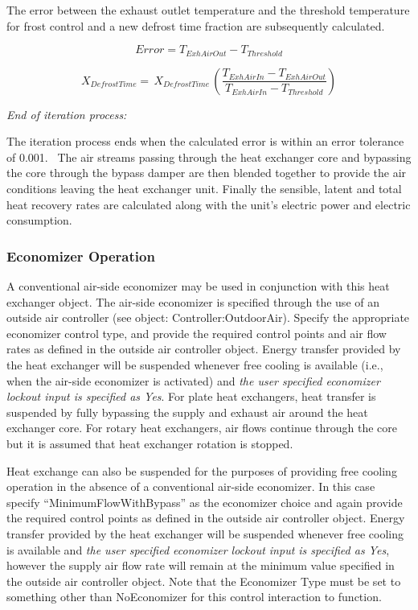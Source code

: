 The error between the exhaust outlet temperature and the threshold temperature for frost control and a new defrost time fraction are subsequently calculated.

\begin{equation}
Error = {T_{ExhAirOut}} - {T_{Threshold}}
\end{equation}

\begin{equation}
{X_{DefrostTime}} = \,{X_{DefrostTime}}\,\left( {\frac{{{T_{ExhAirIn}} - {T_{ExhAirOut}}}}{{{T_{ExhAirIn}} - {T_{Threshold}}}}} \right)
\end{equation}

\emph{End of iteration process:}

The iteration process ends when the calculated error is within an error tolerance of 0.001.~ The air streams passing through the heat exchanger core and bypassing the core through the bypass damper are then blended together to provide the air conditions leaving the heat exchanger unit. Finally the sensible, latent and total heat recovery rates are calculated along with the unit's electric power and electric consumption.

\subsubsection{Economizer Operation}\label{economizer-operation}

A conventional air-side economizer may be used in conjunction with this heat exchanger object. The air-side economizer is specified through the use of an outside air controller (see object: Controller:OutdoorAir). Specify the appropriate economizer control type, and provide the required control points and air flow rates as defined in the outside air controller object. Energy transfer provided by the heat exchanger will be suspended whenever free cooling is available (i.e., when the air-side economizer is activated) and \emph{the user specified economizer lockout input is specified as Yes}. For plate heat exchangers, heat transfer is suspended by fully bypassing the supply and exhaust air around the heat exchanger core. For rotary heat exchangers, air flows continue through the core but it is assumed that heat exchanger rotation is stopped.

Heat exchange can also be suspended for the purposes of providing free cooling operation in the absence of a conventional air-side economizer. In this case specify ``MinimumFlowWithBypass'' as the economizer choice and again provide the required control points as defined in the outside air controller object. Energy transfer provided by the heat exchanger will be suspended whenever free cooling is available and \emph{the user specified economizer lockout input is specified as Yes}, however the supply air flow rate will remain at the minimum value specified in the outside air controller object. Note that the Economizer Type must be set to something other than NoEconomizer for this control interaction to function.

